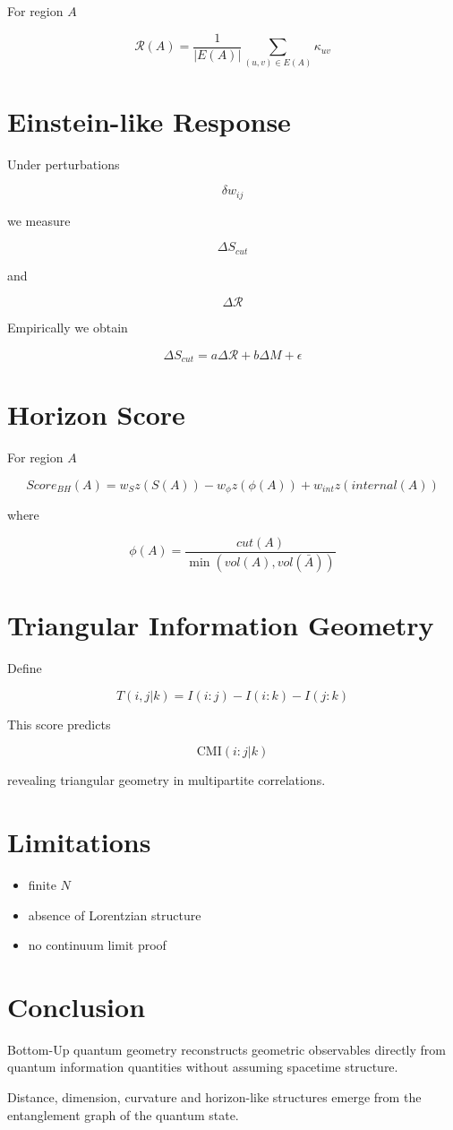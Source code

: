 \documentclass[11pt,a4paper]{article}
\begin{document}
For region $A$

\[
\mathcal{R}(A)
=
\frac{1}{|E(A)|}
\sum_{(u,v)\in E(A)}
\kappa_{uv}
\]

\section{Einstein-like Response}

Under perturbations

\[
\delta w_{ij}
\]

we measure

\[
\Delta S_{cut}
\]

and

\[
\Delta \mathcal{R}
\]

Empirically we obtain

\[
\Delta S_{cut}
=
a\Delta \mathcal{R}
+
b\Delta M
+
\epsilon
\]

\section{Horizon Score}

For region $A$

\[
Score_{BH}(A)
=
w_S z(S(A))
-
w_\phi z(\phi(A))
+
w_{int}z(internal(A))
\]

where

\[
\phi(A)
=
\frac{cut(A)}{\min(vol(A),vol(\bar A))}
\]

\section{Triangular Information Geometry}

Define

\[
T(i,j|k)
=
I(i:j)-I(i:k)-I(j:k)
\]

This score predicts

\[
\mathrm{CMI}(i:j|k)
\]

revealing triangular geometry in multipartite correlations.

\section{Limitations}

\begin{itemize}
\item finite $N$
\item absence of Lorentzian structure
\item no continuum limit proof
\end{itemize}

\section{Conclusion}

Bottom-Up quantum geometry reconstructs geometric observables directly from quantum information quantities without assuming spacetime structure.

Distance, dimension, curvature and horizon-like structures emerge from the entanglement graph of the quantum state.
\end{document}
